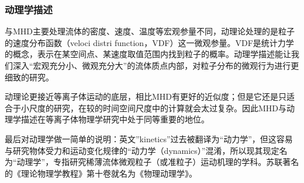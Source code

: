			\subsubsection{动理学描述}
			与MHD主要处理流体的密度、速度、温度等宏观参量不同，动理论处理的是粒子的速度分布函数（veloci distri function，VDF）这一微观参量。VDF是统计力学的概念，表示在某空间点、某速度取值范围内找到粒子的概率。动理学描述能让我们深入“宏观充分小、微观充分大”的流体质点内部，对粒子分布的微观行为进行更细致的研究。
			
			动理论更接近等离子体运动的底层，相比MHD有更好的近似度；但是它还是只适合于小尺度的研究，在较的时间空间尺度中的计算就会太过复杂。因此MHD与动理学描述在等离子体物理学研究中处于同等重要的地位。
			
			最后对动理学做一简单的说明：英文”kinetics”过去被翻译为“动力学”，但这容易与研究物体受力和运动变化规律的“动力学（dynamics）”混淆，所以现其现定名为“动理学”，专指研究稀薄流体微观粒子（或准粒子）运动机理的学科。苏联著名的《理论物理学教程》第十卷就名为《物理动理学》。

			






